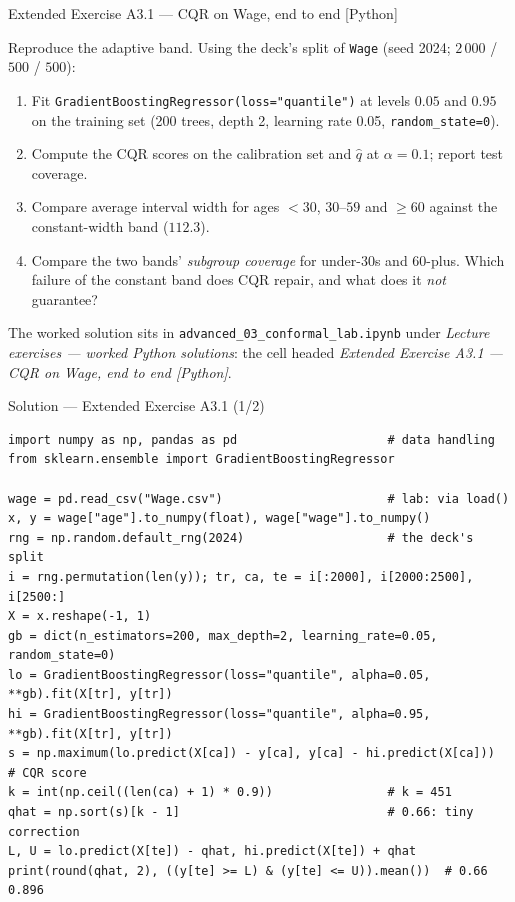 \documentclass[aspectratio=169,11pt]{beamer}
\begin{document}
\begin{frame}{Extended Exercise A3.1 --- CQR on Wage, end to end [Python]}
\begin{longexercise}
  Reproduce the adaptive band. Using the deck's split of \texttt{Wage}
  (seed 2024; $2\,000$ / $500$ / $500$):
  \begin{enumerate}
    \item Fit \texttt{GradientBoostingRegressor(loss="quantile")} at levels $0.05$
          and $0.95$ on the training set (200 trees, depth 2, learning rate 0.05,
          \texttt{random\_state=0}).
    \item Compute the CQR scores on the calibration set and $\hat q$ at
          $\alpha = 0.1$; report test coverage.
    \item Compare average interval width for ages $<30$, $30$--$59$ and $\ge 60$
          against the constant-width band ($112.3$).
    \item Compare the two bands' \emph{subgroup coverage} for under-30s and 60-plus.
          Which failure of the constant band does CQR repair, and what does it
          \emph{not} guarantee?
  \end{enumerate}
\end{longexercise}
\begin{labnote}
  The worked solution sits in \texttt{advanced\_03\_conformal\_lab.ipynb} under
  \emph{Lecture exercises --- worked Python solutions}: the cell headed
  \emph{Extended Exercise A3.1 --- CQR on Wage, end to end [Python]}.
\end{labnote}
\end{frame}

\begin{frame}[fragile]{Solution --- Extended Exercise A3.1 (1/2)}
\begin{solutionbox}
\begin{lstlisting}[basicstyle=\ttfamily\scriptsize]
import numpy as np, pandas as pd                     # data handling
from sklearn.ensemble import GradientBoostingRegressor

wage = pd.read_csv("Wage.csv")                       # lab: via load()
x, y = wage["age"].to_numpy(float), wage["wage"].to_numpy()
rng = np.random.default_rng(2024)                    # the deck's split
i = rng.permutation(len(y)); tr, ca, te = i[:2000], i[2000:2500], i[2500:]
X = x.reshape(-1, 1)
gb = dict(n_estimators=200, max_depth=2, learning_rate=0.05, random_state=0)
lo = GradientBoostingRegressor(loss="quantile", alpha=0.05, **gb).fit(X[tr], y[tr])
hi = GradientBoostingRegressor(loss="quantile", alpha=0.95, **gb).fit(X[tr], y[tr])
s = np.maximum(lo.predict(X[ca]) - y[ca], y[ca] - hi.predict(X[ca]))  # CQR score
k = int(np.ceil((len(ca) + 1) * 0.9))                # k = 451
qhat = np.sort(s)[k - 1]                             # 0.66: tiny correction
L, U = lo.predict(X[te]) - qhat, hi.predict(X[te]) + qhat
print(round(qhat, 2), ((y[te] >= L) & (y[te] <= U)).mean())  # 0.66 0.896
\end{lstlisting}
\end{solutionbox}
\end{frame}
\end{document}
